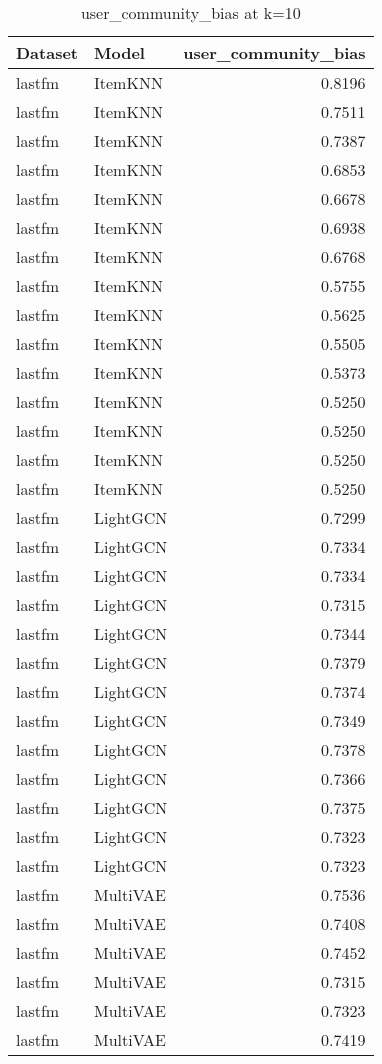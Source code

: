 \begin{table}[htbp]
\centering
\caption{user_community_bias at k=10}
\begin{tabular}{llr}
\toprule
Dataset & Model & user_community_bias \\
\midrule
lastfm & ItemKNN & 0.8196 \\
lastfm & ItemKNN & 0.7511 \\
lastfm & ItemKNN & 0.7387 \\
lastfm & ItemKNN & 0.6853 \\
lastfm & ItemKNN & 0.6678 \\
lastfm & ItemKNN & 0.6938 \\
lastfm & ItemKNN & 0.6768 \\
lastfm & ItemKNN & 0.5755 \\
lastfm & ItemKNN & 0.5625 \\
lastfm & ItemKNN & 0.5505 \\
lastfm & ItemKNN & 0.5373 \\
lastfm & ItemKNN & 0.5250 \\
lastfm & ItemKNN & 0.5250 \\
lastfm & ItemKNN & 0.5250 \\
lastfm & ItemKNN & 0.5250 \\
lastfm & LightGCN & 0.7299 \\
lastfm & LightGCN & 0.7334 \\
lastfm & LightGCN & 0.7334 \\
lastfm & LightGCN & 0.7315 \\
lastfm & LightGCN & 0.7344 \\
lastfm & LightGCN & 0.7379 \\
lastfm & LightGCN & 0.7374 \\
lastfm & LightGCN & 0.7349 \\
lastfm & LightGCN & 0.7378 \\
lastfm & LightGCN & 0.7366 \\
lastfm & LightGCN & 0.7375 \\
lastfm & LightGCN & 0.7323 \\
lastfm & LightGCN & 0.7323 \\
lastfm & MultiVAE & 0.7536 \\
lastfm & MultiVAE & 0.7408 \\
lastfm & MultiVAE & 0.7452 \\
lastfm & MultiVAE & 0.7315 \\
lastfm & MultiVAE & 0.7323 \\
lastfm & MultiVAE & 0.7419 \\

\end{tabular}
\end{table}
